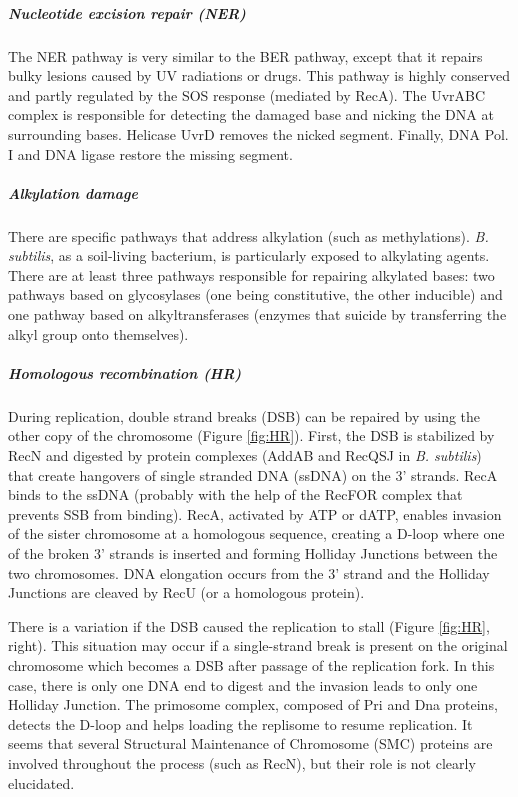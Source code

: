 \subparagraph{Nucleotide excision repair (NER)} The NER pathway is very similar to the BER pathway, except that it repairs bulky lesions caused by UV radiations or drugs. This pathway is highly conserved and partly regulated by the SOS response (mediated by RecA). The UvrABC complex is responsible for detecting the damaged base and nicking the DNA at surrounding bases. Helicase UvrD removes the nicked segment. Finally, DNA Pol. I and DNA ligase restore the missing segment.

\subparagraph{Alkylation damage} There are specific pathways that address alkylation (such as methylations). \textit{B. subtilis}, as a soil-living bacterium, is particularly exposed to alkylating agents. There are at least three pathways responsible for repairing alkylated bases: two pathways based on glycosylases (one being constitutive, the other inducible) and one pathway based on alkyltransferases (enzymes that suicide by transferring the alkyl group onto themselves).

\subparagraph{Homologous recombination (HR)} During replication, double strand breaks (DSB) can be repaired by using the other copy of the chromosome (Figure \ref{fig:HR}). First, the DSB is stabilized by RecN and digested by protein complexes (AddAB and RecQSJ in \textit{B. subtilis}) that create hangovers of single stranded DNA (ssDNA) on the 3' strands. RecA binds to the ssDNA (probably with the help of the RecFOR complex that prevents SSB from binding). RecA, activated by ATP or dATP, enables invasion of the sister chromosome at a homologous sequence, creating a D-loop where one of the broken 3' strands is inserted and forming Holliday Junctions between the two chromosomes. DNA elongation occurs from the 3' strand and the Holliday Junctions are cleaved by RecU (or a homologous protein).

There is a variation if the DSB caused the replication to stall (Figure \ref{fig:HR}, right). This situation may occur if a single-strand break is present on the original chromosome which becomes a DSB after passage of the replication fork. In this case, there is only one DNA end to digest and the invasion leads to only one Holliday Junction. The primosome complex, composed of Pri and Dna proteins, detects the D-loop and helps loading the replisome to resume replication. It seems that several Structural Maintenance of Chromosome (SMC) proteins are involved throughout the process (such as RecN), but their role is not clearly elucidated.

